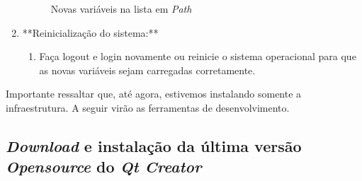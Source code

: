 \documentclass[a4paper,11pt]{article}
\newcommand{\qtcreator}{\textit{Qt Creator}}
\begin{document}
\begin{enumerate}
	\begin{figure}[H]\centering
		\caption{Novas variáveis na lista em \emph{Path}}\label{fig:qtpathenv}
	\end{figure}
	
	\item **Reinicialização do sistema:**
	\begin{enumerate}
		\item Faça logout e login novamente ou reinicie o sistema operacional para que as novas variáveis sejam carregadas corretamente.
	\end{enumerate}
\end{enumerate}

Importante ressaltar que, até agora, estivemos instalando somente a infraestrutura.  A seguir virão as ferramentas de desenvolvimento.


\subsection{\textit{Download} e instalação da última versão \textit{Opensource} do \qtcreator{}}
\end{document}
